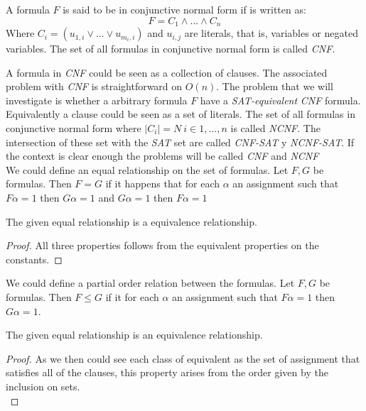 	
	
\begin{definition}
	A formula $F$ is said to be in conjunctive normal form if is written as:
	$$F = C_1\wedge ... \wedge C_n$$
	Where $C_i = (u_{1,i} \vee ... \vee u_{m_i,i})$  and $u_{i,j}$ are literals, that is, variables or negated variables. The set of all formulas in conjunctive normal form is called \emph{CNF}.
\end{definition}
	
A formula in \emph{CNF} could be seen as a collection of clauses. The associated problem with \emph{CNF} is straightforward on $O(n)$. The problem that we will investigate is whether a arbitrary formula $F$ have a \emph{SAT-equivalent} \emph{CNF} formula.
Equivalently a clause could be seen as a set of literals. The set of all formulas in conjunctive normal form where $|C_i| = N\ i \in 1,...,n$ is called \emph{NCNF}. The intersection of these set with the \emph{SAT} set are called \emph{CNF-SAT} y \emph{NCNF-SAT}. If the context is clear enough the problems will be called \emph{CNF} and \emph{NCNF}\\


	We could define an equal relationship on the set of formulas. Let $F,G$ be formulas. Then $F= G$ if it happens that for each $\alpha$ an assignment such that $F\alpha = 1$ then $G\alpha = 1$ and $G\alpha = 1$ then $F\alpha = 1$

\begin{proposition} 
	The given equal relationship is a equivalence relationship.
\end{proposition}
\begin{proof}
	All three properties follows from the equivalent properties on the constants.

        \end{proof}
	
	
	We could define a partial order relation between the formulas.	Let $F,G$ be formulas. Then $F\le G$ if it for each $\alpha$ an assignment such that $F\alpha = 1$ then $G\alpha = 1$. \\
	
	
\begin{proposition} 
	The given equal relationship is an equivalence relationship.
\end{proposition}
\begin{proof}
As we then could see each class of equivalent as the set of assignment that satisfies all of the clauses, this property arises from the order given by the inclusion on sets.\\
\end{proof}
	
